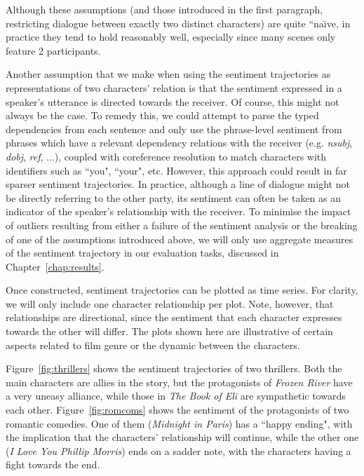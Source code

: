 \documentclass[bsc,frontabs,deptreport,singlespacing,parskip, twoside]{infthesis}
\begin{document}
Although these assumptions (and those introduced in the first paragraph, restricting dialogue between exactly two distinct characters) are quite “na\"{\i}ve, in practice they tend to hold reasonably well, especially since many scenes only feature 2 participants.

Another assumption that we make when using the sentiment trajectories as representations of two characters' relation is that the sentiment expressed in a speaker's utterance is directed towards the receiver. Of course, this might not always be the case. To remedy this, we could attempt to parse the typed dependencies from each sentence and only use the phrase-level sentiment from phrases which have a relevant dependency relations with the receiver (e.g. \textit{nsubj}, \textit{dobj}, \textit{ref}, ...), coupled with coreference resolution to match characters with identifiers such as ``you", ``your", etc. However, this approach could result in far sparser sentiment trajectories. In practice, although a line of dialogue might not be directly referring to the other party, its sentiment can often be taken as an indicator of the speaker's relationship with the receiver. To minimise the impact of outliers resulting from either a failure of the sentiment analysis or the breaking of one of the assumptions introduced above, we will only use aggregate measures of the sentiment trajectory in our evaluation tasks, discussed in Chapter~\ref{chap:results}.

Once constructed, sentiment trajectories can be plotted as time series. For clarity, we will only include one character relationship per plot. Note, however, that relationships are directional, since the sentiment that each character expresses towards the other will differ. The plots shown here are illustrative of certain aspects related to film genre or the dynamic between the characters. 

Figure~\ref{fig:thrillers} shows the sentiment trajectories of two thrillers. Both the main characters are allies in the story, but the protagonists of \textit{Frozen River} have a very uneasy alliance, while those in \textit{The Book of Eli} are sympathetic towards each other. Figure~\ref{fig:romcoms} shows the sentiment of the protagonists of two romantic  comedies. One of them (\textit{Midnight in Paris}) has a ``happy ending", with the implication that the characters' relationship will continue, while the other one (\textit{I Love You Phillip Morris}) ends on a sadder note, with the characters having a fight towards the end.
\end{document}
